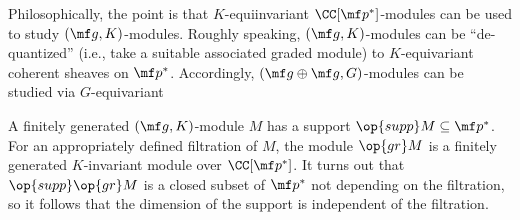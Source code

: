 \documentclass[../notes.tex]{subfiles}
\begin{document}
\begin{remark}
	Philosophically, the point is that $K$-equiinvariant $\CC[\mf p^*]$-modules can be used to study $(\mf g,K)$-modules. Roughly speaking, $(\mf g,K)$-modules can be ``de-quantized'' (i.e., take a suitable associated graded module) to $K$-equivariant coherent sheaves on $\mf p^*$. Accordingly, $(\mf g\oplus\mf g,G)$-modules can be studied via $G$-equivariant 
\end{remark}
\begin{example}
	A finitely generated $(\mf g,K)$-module $M$ has a support $\op{supp}M\subseteq\mf p^*$. For an appropriately defined filtration of $M$, the module $\op{gr}M$ is a finitely generated $K$-invariant module over $\CC[\mf p^*]$. It turns out that $\op{supp}\op{gr}M$ is a closed subset of $\mf p^*$ not depending on the filtration, so it follows that the dimension of the support is independent of the filtration.
\end{example}
\end{document}
